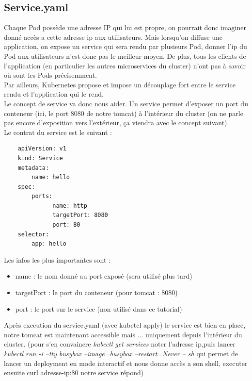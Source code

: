 \documentclass[11pt,fleqn]{book} %
\begin{document}
\subsection*{Service.yaml}
Chaque Pod possède une adresse IP qui lui est propre, on pourrait donc imaginer donné accès a cette adresse ip aux utilisateurs. Mais lorsqu'on diffuse une application, on expose un service qui sera rendu par plusieurs Pod, donner l'ip du Pod aux utilisateurs n'est donc pas le meilleur moyen. De plus, tous les clients de l'application (en particulier les autres microservices du cluster) n'ont pas à savoir où sont les Pods précisemment. \\
Par ailleurs, Kubernetes propose et impose un découplage fort entre le service rendu et l'application qui le rend. \\ 

Le concept de service va donc nous aider. Un service permet d'exposer un port du conteneur (ici, le port 8080 de notre tomcat) à l'intérieur du cluster (on ne parle pas encore d'exposition vers l'extérieur, ça viendra avec le concept suivant). \\
Le contrat du service est le suivant : 
\begin{verbatim}
    apiVersion: v1
    kind: Service
    metadata:
        name: hello
    spec:
        ports:
            - name: http
              targetPort: 8080
              port: 80
    selector:
        app: hello
\end{verbatim}
Les infos les plus importantes sont : 
\begin{itemize}
    \item name : le nom donné au port exposé (sera utilisé plus tard)
    \item targetPort : le port du conteneur (pour tomcat : 8080)
    \item port : le port sur le service (non utilisé dans ce tutorial)
\end{itemize}

Après execution du service.yaml (avec kubetcl apply) le service est bien en place, notre tomcat est maintenant accessible mais ... uniquement depuis l'intérieur du cluster. (pour s'en convaincre \textit{kubectl get services} noter l'adresse ip,puis lancer  \textit{kubectl run -i --tty busybox --image=busybox --restart=Never -- sh } qui permet de lancer un deployment en mode interactif et nous donne accès a son shell, executer ensuite curl adresse-ip:80 notre service répond)
\end{document}
